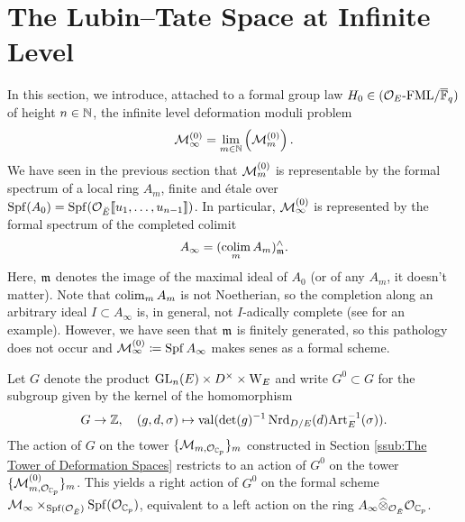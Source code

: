 \documentclass[../main.tex]{subfiles}
\begin{document}
\section{The Lubin--Tate Space at Infinite Level}
In this section, we introduce, attached to a formal group law
$H_0 \in {({\mathcal{O}_E}\text-\allowbreak\mathrm{FML}/{{\overline{\mathbb{F}}_q}})}$ of height $n \in \mathbb{N}$, the infinite level
deformation moduli problem
\begin{equation*}
  \mathcal{M}_{\infty}^{(0)} = \lim_{m \in \mathbb{N}} \left(\mathcal{M}_{m}^{(0)}\right).
\end{equation*}
We have seen in the previous section that $\mathcal{M}_{m}^{(0)}$ is 
representable by the formal spectrum of a local ring $A_m$, finite and \'etale
over $\operatorname{Spf}(A_0) = \operatorname{Spf}(\mathcal{O}_{{\breve {E}}}\llbracket u_1, \dots, u_{n-1}\rrbracket)$. In particular,
$\mathcal{M}_{\infty}^{(0)}$ is represented by 
the formal spectrum of the completed colimit 
\begin{equation*}
  A_\infty = (\operatorname*{colim}_m A_m)^\wedge_{\mathfrak{m}}.
\end{equation*}
Here, $\mathfrak{m}$ denotes the image of the maximal ideal of $A_0$ (or of any $A_m$, it doesn't
matter). Note that $\operatorname*{colim}_m A_m$ is not Noetherian, so the completion 
along an arbitrary ideal $I \subset A_\infty$ is, in general, not $I$-adically
complete (see \cite[\href{https://stacks.math.columbia.edu/tag/05JA}{Tag
05JA}]{stacks-project} for an example). However, we have seen that $\mathfrak{m}$ is
finitely generated, so this pathology does not occur and $\mathcal{M}_\infty^{(0)}
\coloneqq \operatorname{Spf} A_\infty$ makes senes as a formal scheme.

Let $G$ denote the product $\operatorname{GL}_n(E) \times D^\times \times \mathrm W_E$
and write $G^0 \subset G$ for the subgroup given by the kernel of the homomorphism
\begin{equation*}
  G \to \mathbb{Z}, \quad (g, d, \sigma) \mapsto \mathrm{val}( \det(g)^{-1} \operatorname{Nrd}_{D/E}(d)
  \mathrm{Art}_E^{-1}(\sigma)). 
\end{equation*}
The action of $G$ on the tower $\{\mathcal{M}_{m, \mathcal{O}_{\mathbb{C}_p}}\}_m$ constructed in
Section \ref{ssub:The
Tower of Deformation Spaces} restricts to an action of $G^0$ on the tower
$\{\mathcal{M}_{m, \mathcal{O}_{\mathbb{C}_p}}^{(0)}\}_m$. This yields a right action of $G^0$ on the formal 
scheme $\mathcal{M}_{\infty}\times_{\operatorname{Spf}(\mathcal{O}_{\breve {E}})} \operatorname{Spf}(\mathcal{O}_{\mathbb{C}_p})$, equivalent to
a left action on the ring $A_\infty \widehat \otimes_{\mathcal{O}_{\breve {E}}} \mathcal{O}_{\mathbb{C}_p}$.
\end{document}
